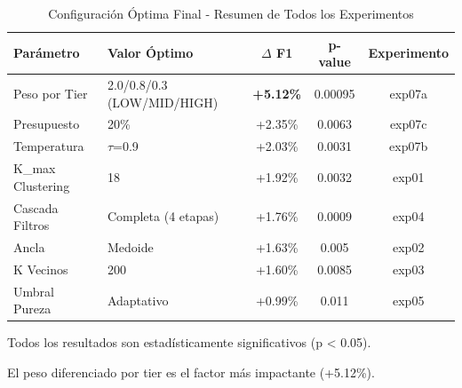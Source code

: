 \begin{table}[htbp]
\centering
\caption{Configuración Óptima Final - Resumen de Todos los Experimentos}
\label{tab:summary_optimal}
\begin{tabular}{llccc}
\toprule
\textbf{Parámetro} & \textbf{Valor Óptimo} & \textbf{$\Delta$ F1} & \textbf{p-value} & \textbf{Experimento} \\
\midrule
\rowcolor{yellow!30}
Peso por Tier & 2.0/0.8/0.3 (LOW/MID/HIGH) & \textbf{+5.12\%} & 0.00095 & exp07a \\
Presupuesto & 20\% & +2.35\% & 0.0063 & exp07c \\
Temperatura & $\tau$=0.9 & +2.03\% & 0.0031 & exp07b \\
K\_max Clustering & 18 & +1.92\% & 0.0032 & exp01 \\
Cascada Filtros & Completa (4 etapas) & +1.76\% & 0.0009 & exp04 \\
Ancla & Medoide & +1.63\% & 0.005 & exp02 \\
K Vecinos & 200 & +1.60\% & 0.0085 & exp03 \\
Umbral Pureza & Adaptativo & +0.99\% & 0.011 & exp05 \\
\bottomrule
\end{tabular}
\begin{tablenotes}
\small
\item Todos los resultados son estadísticamente significativos (p < 0.05).
\item El peso diferenciado por tier es el factor más impactante (+5.12\%).
\end{tablenotes}
\end{table}
